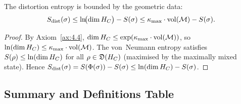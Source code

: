 \begin{proposition}
\label{prop:8.6}
The distortion entropy is bounded by the geometric data:
\[
  S_{\mathrm{dist}}(\sigma) \leq
  \ln\!\bigl(\dim H_C\bigr) - S(\sigma)
  \leq \kappa_{\max} \cdot \mathrm{vol}(\mathcal{M}) - S(\sigma).
\]
\end{proposition}

\begin{proof}
By Axiom~\ref{ax:4.4},
$\dim H_C \leq \exp(\kappa_{\max} \cdot \mathrm{vol}(\mathcal{M}))$, so
$\ln(\dim H_C) \leq \kappa_{\max} \cdot \mathrm{vol}(\mathcal{M})$.  The
von~Neumann entropy satisfies $S(\rho) \leq \ln(\dim H_C)$ for all
$\rho \in \mathfrak{D}(H_C)$ (maximised by the maximally mixed state).
Hence $S_{\mathrm{dist}}(\sigma) = S(\Phi(\sigma)) - S(\sigma) \leq
\ln(\dim H_C) - S(\sigma)$.
\end{proof}

\subsection{Summary and Definitions Table}
\label{sec:ch8:summary}

